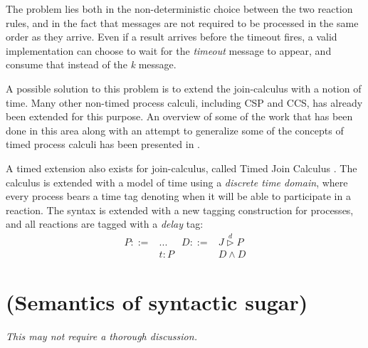 The problem lies both in the non-deterministic choice between the two reaction
rules, and in the fact that messages are not required to be processed in the
same order as they arrive. Even if a result arrives before the timeout fires, a
valid implementation can choose to wait for the \emph{timeout} message to
appear, and consume that instead of the \emph{k} message.

A possible solution to this problem is to extend the join-calculus with a
notion of time. Many other non-timed process calculi, including CSP and CCS,
has already been extended for this purpose. An overview of some of the work
that has been done in this area along with an attempt to generalize some of the
concepts of timed process calculi has been presented in
\cite{nicollin-overview}.

A timed extension also exists for join-calculus, called Timed Join
Calculus \cite{timed-join}. The calculus is extended with a model of time using
a \emph{discrete time domain}, where every process bears a time tag denoting
when it will be able to participate in a reaction. The syntax is extended with
a new tagging construction for processes, and all reactions are tagged with a
\emph{delay} tag:
\begin{align*}
  P ::={} & ...    & D ::={}& J \stackrel{d}{\triangleright} P \\
          & t : P  &        & D \land D
\end{align*}



\section{(Semantics of syntactic sugar)}

\emph{This may not require a thorough discussion.}
